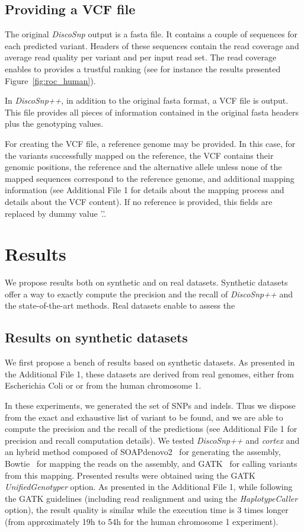 \documentclass{bmcart}
\newcommand{\disco}{{\it DiscoSnp}\xspace}
\newcommand{\discopp}{{\it DiscoSnp++}\xspace}
\newcommand{\co}{{\it cortex}\xspace}
\begin{document}
\subsection*{Providing a VCF file}
The original \disco output is a fasta file. It contains a couple of sequences for each predicted variant. Headers of these sequences contain the read coverage and average read quality per variant and per input read set. The read coverage enables to provides a trustful ranking (see for instance the results presented Figure~\ref{fig:roc_human}).

In \discopp, in addition to the original fasta format, a VCF file is output. This file provides all pieces of information contained in the original fasta headers plus the genotyping values.


For creating the VCF file, a reference genome may be provided. In this case, for the variants successfully mapped on the reference, the VCF contains their genomic positions, the reference and the alternative allele unless none of the mapped sequences correspond to the reference genome, and additional mapping information (see Additional File 1 for details about the mapping process and details about the VCF content). 
If no reference is provided, this fields are replaced by dummy value '.'.




\section*{Results}
We propose results both on synthetic and on real datasets. Synthetic datasets offer a way to exactly compute the precision and the recall of \discopp and the state-of-the-art methods. Real datasets enable to assess the 

\subsection*{Results on synthetic datasets}
We first propose a bench of results based on synthetic datasets. As presented in the Additional File 1, these datasets are derived from real genomes, either from Escherichia Coli or or from the human chromosome 1. 

In these experiments, we generated the set of SNPs and indels. Thus we dispose from the exact and exhaustive list of variant to be found, and we are able to compute the precision and the recall of the predictions (see Additional File 1 for precision and recall computation details). We tested \discopp and \co and an hybrid method composed of SOAPdenovo2~\cite{luo2012soapdenovo2} for generating the assembly, Bowtie~\cite{langmead2012fast} for mapping the reads on the assembly, and GATK~\cite{gatk} for calling variants from this mapping. Presented results were obtained using the GATK \emph{UnifiedGenotyper} option. As presented in the Additional File 1, while following the GATK guidelines (including read realignment and using the \emph{HaplotypeCaller} option), the result quality is similar while the execution time is 3 times longer (from approximately 19h to 54h for the human chromosome 1 experiment). 
\end{document}
